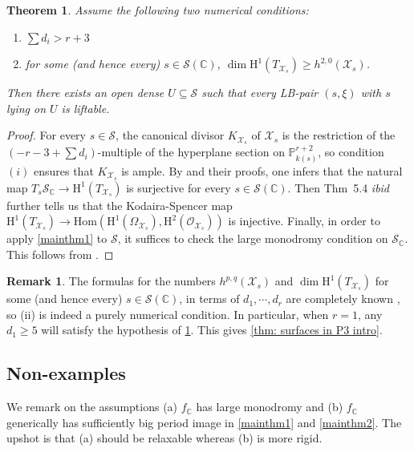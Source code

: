 \documentclass[letter, 11pt]{article}
\theoremstyle{plain}
\newtheorem{theorem}[subsubsection]{Theorem}
\theoremstyle{definition}
\newtheorem{remark}[subsubsection]{Remark}
\newcommand{\IC}{\mathbb{C}}
\newcommand{\IP}{\mathbb{P}}
\newcommand{\Hom}{\mathrm{Hom}}
\newcommand{\<}{\langle}
\renewcommand{\>}{\rangle}
\newcommand{\sX}{\mathcal{X}}
\newcommand{\sS}{\mathcal{S}}
\newcommand{\sO}{\mathcal{O}}
\renewcommand{\H}{\mathrm{H}}
\begin{document}
\begin{theorem}
\label{thm: surfaces in P3}
    Assume the following two numerical conditions: 
    \begin{enumerate}[label=\upshape{(\roman*)}]
        \item $\sum d_i > r + 3$
        \item for some (and hence every) $s \in \sS(\IC)$, $\dim \H^1(T_{\sX_s}) \ge h^{2, 0}(\sX_s)$. 
    \end{enumerate}
    Then there exists an open dense $U \subseteq \sS$ such that every LB-pair $(s, \xi)$ with $s$ lying on $U$ is liftable. 
\end{theorem}
\begin{proof}
    For every $s \in \sS$, the canonical divisor $K_{\sX_s}$ of $\sX_s$ is the restriction of the $(- r - 3 + \sum d_i)$-multiple of the hyperplane section on $\IP^{r + 2}_{k(s)}$, so condition $(i)$ ensures that $K_{\sX_s}$ is ample. By \cite[Cor.~1.9, Thm~3.5]{Peters} and their proofs, one infers that the natural map $T_s \sS_\IC \to \H^1(T_{\sX_s})$ is surjective for every $s \in \sS(\IC)$. Then Thm~5.4 \textit{ibid} further tells us that the Kodaira-Spencer map $\H^1(T_{\sX_s}) \to \Hom(\H^1(\Omega_{\sX_s}), \H^2(\sO_{\sX_s}))$ is injective. Finally, in order to apply \ref{mainthm1} to $\sS$, it suffices to check the large monodromy condition on $\sS_\IC$. This follows from \cite[Thm~5]{Beauville}. 
\end{proof}

\begin{remark}
    The formulas for the numbers $h^{p, q}(\sX_s)$ and $\dim \H^1(T_{\sX_s})$ for some (and hence every) $s \in \sS(\IC)$, in terms of $d_1, \cdots, d_r$ are completely known \cite[théorème 2.3]{zbMATH03417601}, so (ii) is indeed a purely numerical condition. In particular, when $r = 1$, any $d_1 \ge 5$ will satisfy the hypothesis of \ref{thm: surfaces in P3}. This gives \ref{thm: surfaces in P3 intro}. 
\end{remark}

\subsection{Non-examples}
\label{sec: non-examples}

We remark on the assumptions (a) $f_\IC$ has large monodromy and (b) $f_\IC$ generically has sufficiently big period image in \ref{mainthm1} and \ref{mainthm2}. The upshot is that (a) should be relaxable whereas (b) is more rigid. 
\end{document}
